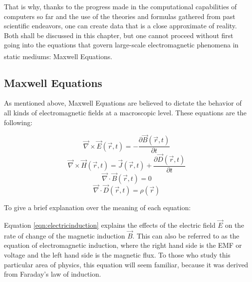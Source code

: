 That is why, thanks to the progress made in the computational capabilities of computers so far and the use of the theories and formulas gathered from past scientific endeavors, one can create data that is a close approximate of reality. Both shall be discussed in this chapter, but one cannot proceed without first going into the equations that govern large-scale electromagnetic phenomena in static mediums\textsuperscript{\cite{stratton2007electromagnetic}}: Maxwell Equations.

\subsection{Maxwell Equations}

As mentioned above, Maxwell Equations are believed to dictate the behavior of all kinds of electromagnetic fields at a macroscopic level. These equations are the following:

\begin{equation}
	\label{eqn:electricinduction}
	\vec{\nabla} \times \vec{E}(\vec{r},t) = - \frac{\partial \vec{B}(\vec{r},t)}{\partial t}
\end{equation}
\begin{equation}
	\label{eqn:amperesLaw}
	\vec{\nabla} \times \vec{H}(\vec{r},t) = \vec{J}(\vec{r},t) + \frac{\partial \vec{D}(\vec{r},t)}{\partial t}
\end{equation}
\begin{equation}
	\label{eqn:magneticDivergence}
	\vec{\nabla} \cdot \vec{B}(\vec{r},t) = 0
\end{equation}
\begin{equation}
	\label{eqn:gausslaw}
	\vec{\nabla} \cdot \vec{D}(\vec{r},t) = \rho (\vec{r})
\end{equation}

To give a brief explanation over the meaning of each equation:

Equation \ref{eqn:electricinduction} explains the effects of the electric field $\vec{E}$ on the rate of change of the magnetic induction $\vec{B}$. This can also be referred to as the equation of electromagnetic induction, where the right hand side is the EMF or voltage and the left hand side is the magnetic flux. To those who study this particular area of physics, this equation will seem familiar, because it was derived from Faraday's law of induction.

